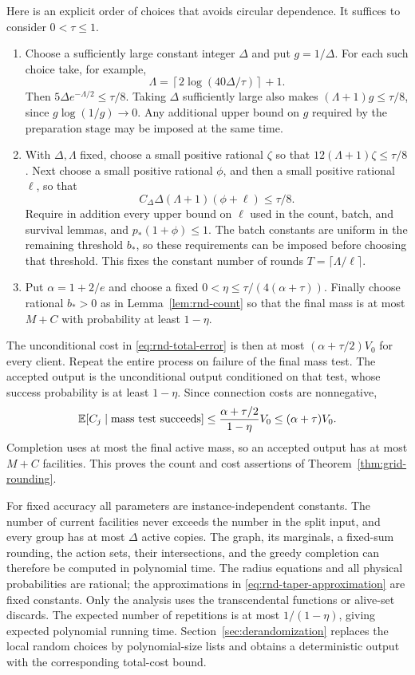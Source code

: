 Here is an explicit order of choices that avoids circular dependence.
It suffices to consider $0<\tau\le1$.
\begin{enumerate}
\item Choose a sufficiently large constant integer $\Delta$ and put
$g=1/\Delta$.  For each such choice take, for example,
\[
 \Lambda=\left\lceil2\log(40\Delta/\tau)\right\rceil+1.
\]
Then $5\Delta e^{-\Lambda/2}\le\tau/8$.  Taking $\Delta$ sufficiently
large also makes $(\Lambda+1)g\le\tau/8$, since
$g\log(1/g)\longrightarrow0$.  Any additional upper bound on $g$
required by the preparation stage may be imposed at the same time.
\item With $\Delta,\Lambda$ fixed, choose a small positive rational
$\zeta$ so that $12(\Lambda+1)\zeta\le\tau/8$.
Next choose a small positive rational $\phi$, and then a small positive
rational $\ell$, so that
\[
 C_\Delta\Delta(\Lambda+1)(\phi+\ell)\le\tau/8.
\]
Require in addition every upper bound on $\ell$ used in the count,
batch, and survival lemmas, and $p_*(1+\phi)\le1$.
The batch constants are uniform in the remaining threshold $b_*$,
so these requirements can be imposed before choosing that threshold.
This fixes the constant number of rounds $T=\lceil\Lambda/\ell\rceil$.
\item Put $\alpha=1+2/e$ and choose a fixed
$0<\eta\le\tau/(4(\alpha+\tau))$.
Finally choose rational $b_*>0$ as in Lemma~\ref{lem:rnd-count} so
that the final mass is at most $M+C$ with probability at least
$1-\eta$.
\end{enumerate}
The unconditional cost in \eqref{eq:rnd-total-error} is then at most
$(\alpha+\tau/2)V_0$ for every client.  Repeat the entire process on
failure of the final mass test.  The accepted output is the
unconditional output conditioned on that test, whose success
probability is at least $1-\eta$.  Since connection costs are
nonnegative,
\[
 \mathbb E[C_j\mid\text{mass test succeeds}]
 \le\frac{\alpha+\tau/2}{1-\eta}V_0
 \le(\alpha+\tau)V_0.
\]
Completion uses at most the final active mass, so an accepted output
has at most $M+C$ facilities.  This proves the count and cost assertions
of Theorem~\ref{thm:grid-rounding}.

For fixed accuracy all parameters are instance-independent constants.
The number of current facilities never exceeds the number in the
split input, and every group has at most $\Delta$ active copies.
The graph, its marginals, a fixed-sum rounding, the action sets,
their intersections, and the greedy completion can therefore be
computed in polynomial time.  The radius equations and all physical
probabilities are rational; the approximations in
\eqref{eq:rnd-taper-approximation} are fixed constants.  Only the
analysis uses the transcendental functions or alive-set discards.
The expected number of repetitions is at most $1/(1-\eta)$, giving
expected polynomial running time.  Section~\ref{sec:derandomization}
replaces the local random choices by polynomial-size lists and obtains
a deterministic output with the corresponding total-cost bound.

